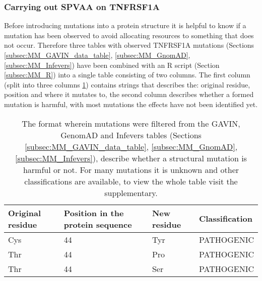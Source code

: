 	\subsubsection{Carrying out SPVAA on TNFRSF1A}
	Before introducing mutations into a protein structure it is helpful to know if a mutation has been observed to avoid allocating resources to something that does not occur. Therefore three tables with observed TNFRSF1A mutations (Sections \ref{subsec:MM_GAVIN_data_table}, \ref{subsec:MM_GnomAD}, \ref{subsec:MM_Infevers}) have been combined with an R script (Section \ref{subsec:MM_R}) into a single table consisting of two columns. The first column (split into three columns \ref{table:Res_Filtered_Mutations}) contains strings that describes the: original residue, position and where it mutates to, the second column describes whether a formed mutation is harmful, with most mutations the effects have not been identified yet. 
	\begin{table}[ht]
		\begin{tabular}{ l | l | l | l}
			Original residue & Position in the protein sequence & New residue & Classification\\ \hline
			Cys & 44 & Tyr & PATHOGENIC\\
			Thr & 44 & Pro & PATHOGENIC\\
			Thr & 44 & Ser & PATHOGENIC\\
		\end{tabular}
		\caption[Sample from the combined observed TNFRSF1A mutations table]{The format wherein mutations were filtered from the GAVIN, GenomAD and Infevers tables (Sections \ref{subsec:MM_GAVIN_data_table},  \ref{subsec:MM_GnomAD}, \ref{subsec:MM_Infevers}),  describe whether a structural mutation is harmful or not. For many mutations it is unknown and other classifications are available, to view the whole table visit the supplementary.}
		\label{table:Res_Filtered_Mutations}
	\end{table}
	
